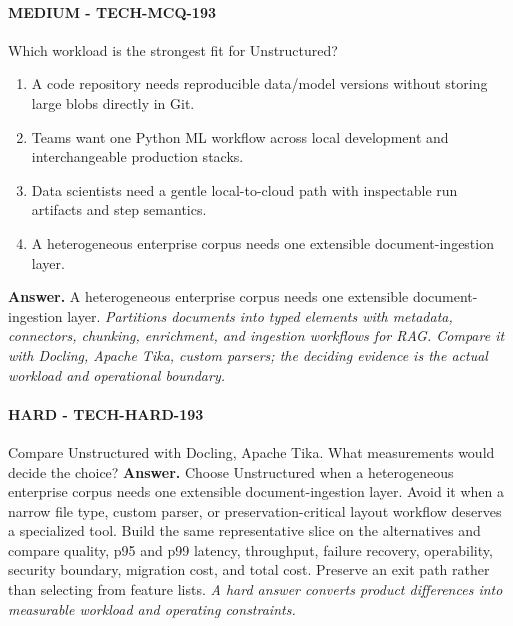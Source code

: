 \paragraph{MEDIUM - TECH-MCQ-193} Which workload is the strongest fit for Unstructured?
\begin{enumerate}[label=\Alph*.]
\item A code repository needs reproducible data/model versions without storing large blobs directly in Git.
\item Teams want one Python ML workflow across local development and interchangeable production stacks.
\item Data scientists need a gentle local-to-cloud path with inspectable run artifacts and step semantics.
\item A heterogeneous enterprise corpus needs one extensible document-ingestion layer.
\end{enumerate}
\textbf{Answer.} A heterogeneous enterprise corpus needs one extensible document-ingestion layer.
\textit{Partitions documents into typed elements with metadata, connectors, chunking, enrichment, and ingestion workflows for RAG. Compare it with Docling, Apache Tika, custom parsers; the deciding evidence is the actual workload and operational boundary.}
\paragraph{HARD - TECH-HARD-193} Compare Unstructured with Docling, Apache Tika. What measurements would decide the choice?
\textbf{Answer.} Choose Unstructured when a heterogeneous enterprise corpus needs one extensible document-ingestion layer. Avoid it when a narrow file type, custom parser, or preservation-critical layout workflow deserves a specialized tool. Build the same representative slice on the alternatives and compare quality, p95 and p99 latency, throughput, failure recovery, operability, security boundary, migration cost, and total cost. Preserve an exit path rather than selecting from feature lists.
\textit{A hard answer converts product differences into measurable workload and operating constraints.}
